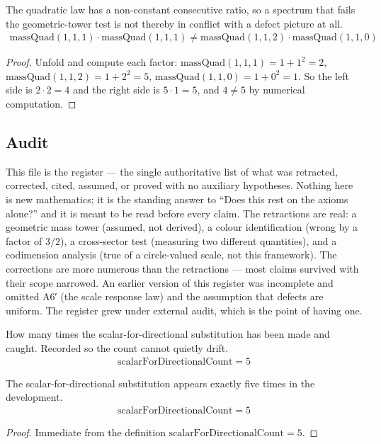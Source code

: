 \begin{theorem}
The quadratic law has a non-constant consecutive ratio, so a spectrum that fails the geometric-tower test is not thereby in conflict with a defect picture at all.
\begin{align*}
\text{massQuad}(1, 1, 1) \cdot \text{massQuad}(1, 1, 1) \neq \text{massQuad}(1, 1, 2) \cdot \text{massQuad}(1, 1, 0)
\end{align*}
\begin{proof}
Unfold and compute each factor: $\text{massQuad}(1,1,1)=1+1^2=2$, $\text{massQuad}(1,1,2)=1+2^2=5$, $\text{massQuad}(1,1,0)=1+0^2=1$. So the left side is $2\cdot2=4$ and the right side is $5\cdot1=5$, and $4\neq5$ by numerical computation.
\end{proof}
\end{theorem}

\subsection{Audit}

This file is the register — the single authoritative list of what was retracted, corrected, cited, assumed, or proved with no auxiliary hypotheses. Nothing here is new mathematics; it is the standing answer to ``Does this rest on the axioms alone?'' and it is meant to be read before every claim.  The retractions are real: a geometric mass tower (assumed, not derived), a colour identification (wrong by a factor of $3/2$), a cross-sector test (measuring two different quantities), and a codimension analysis (true of a circle-valued scale, not this framework). The corrections are more numerous than the retractions — most claims survived with their scope narrowed. An earlier version of this register was incomplete and omitted A6′ (the scale response law) and the assumption that defects are uniform. The register grew under external audit, which is the point of having one.

\begin{definition}
How many times the scalar-for-directional substitution has been made and caught.  Recorded so the count cannot quietly drift.
\begin{align*}
\text{scalarForDirectionalCount} = 5
\end{align*}
\end{definition}

\begin{theorem}
The scalar-for-directional substitution appears exactly five times in the development.
\begin{align*}
\text{scalarForDirectionalCount} = 5
\end{align*}
\begin{proof}
Immediate from the definition $\text{scalarForDirectionalCount}=5$.
\end{proof}
\end{theorem}


